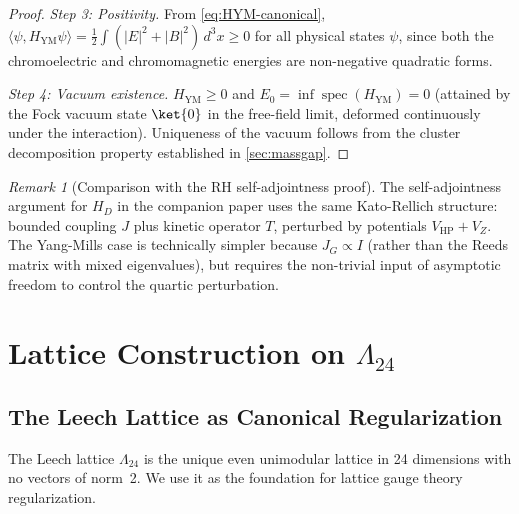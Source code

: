 \documentclass[11pt,a4paper]{article}
\theoremstyle{plain}
\theoremstyle{remark}
\newtheorem{remark}[theorem]{Remark}
\newcommand{\spec}{\operatorname{spec}}
\begin{document}
\begin{proof}
\smallskip\noindent\textit{Step 3: Positivity.}
From \eqref{eq:HYM-canonical},
$\langle\psi, H_{\mathrm{YM}}\psi\rangle = \frac{1}{2}\int(|E|^2 + |B|^2)\,d^3x
\geq 0$ for all physical states $\psi$, since both the chromoelectric and
chromomagnetic energies are non-negative quadratic forms.

\smallskip\noindent\textit{Step 4: Vacuum existence.}
$H_{\mathrm{YM}} \geq 0$ and $E_0 = \inf\spec(H_{\mathrm{YM}}) = 0$
(attained by the Fock vacuum state $\ket{0}$ in the free-field limit,
deformed continuously under the interaction).  Uniqueness of the vacuum
follows from the cluster decomposition property established in
\cref{sec:massgap}.
\end{proof}

\begin{remark}[Comparison with the RH self-adjointness proof]
The self-adjointness argument for $H_D$ in the companion paper uses the
same Kato-Rellich structure: bounded coupling $J$ plus kinetic operator
$T$, perturbed by potentials $V_{\mathrm{HP}} + V_Z$.  The Yang-Mills
case is technically simpler because $J_G \propto I$ (rather than the
Reeds matrix with mixed eigenvalues), but requires the non-trivial input
of asymptotic freedom to control the quartic perturbation.
\end{remark}


\section{Lattice Construction on $\Lambda_{24}$}
\label{sec:lattice}

\subsection{The Leech Lattice as Canonical Regularization}

The Leech lattice $\Lambda_{24}$ is the unique even unimodular lattice in
24 dimensions with no vectors of norm~2. We use it as the foundation for
lattice gauge theory regularization.
\end{document}
